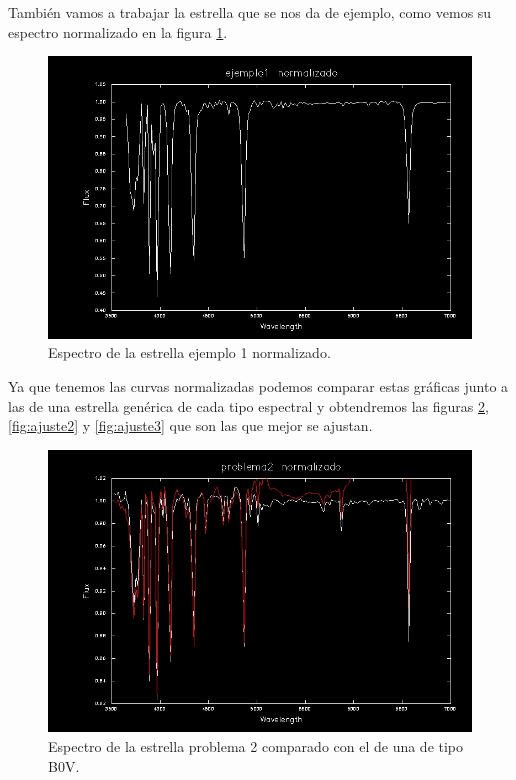 \documentclass{aa} %
\begin{document}
También vamos a trabajar la estrella que se nos da de ejemplo, como vemos su espectro normalizado en la figura \ref{fig:espEj}.

\begin{figure}[h!]
\begin{center}
\includegraphics[scale=0.3]{1 normalizado.png}
\caption{Espectro de la estrella ejemplo 1 normalizado.}
\label{fig:espEj}
\end{center}
\end{figure}

Ya que tenemos las curvas normalizadas podemos comparar estas gráficas junto a las de una estrella genérica de cada tipo espectral y obtendremos las figuras \ref{fig:ajuste1}, \ref{fig:ajuste2} y \ref{fig:ajuste3} que son las que mejor se ajustan.

\begin{figure}[h!]
\begin{center}
\includegraphics[scale=0.3]{2 ajustado.png}
\caption{Espectro de la estrella problema 2 comparado con el de una de tipo B0V.}
\label{fig:ajuste1}
\end{center}
\end{figure}
\end{document}

